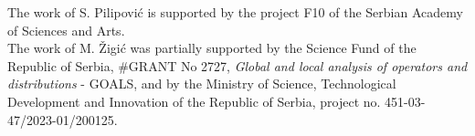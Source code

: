\documentclass[sn-mathphys,Numbered]{sn-jnl}%
\theoremstyle{thmstyleone}%
\theoremstyle{thmstyletwo}%
\theoremstyle{thmstylethree}%
\begin{document}

The work of S. Pilipovi\'c is supported by the project F10 of the Serbian Academy of Sciences and Arts.\\
The work of M. \v Zigi\' c was partially supported by the Science Fund of the Republic of Serbia, \#GRANT No 2727, \textit{Global and local analysis of operators and distributions} - GOALS, and by the Ministry of Science, Technological Development and Innovation of the Republic of Serbia,  project no.  451-03-47/2023-01/200125.

\end{document}
